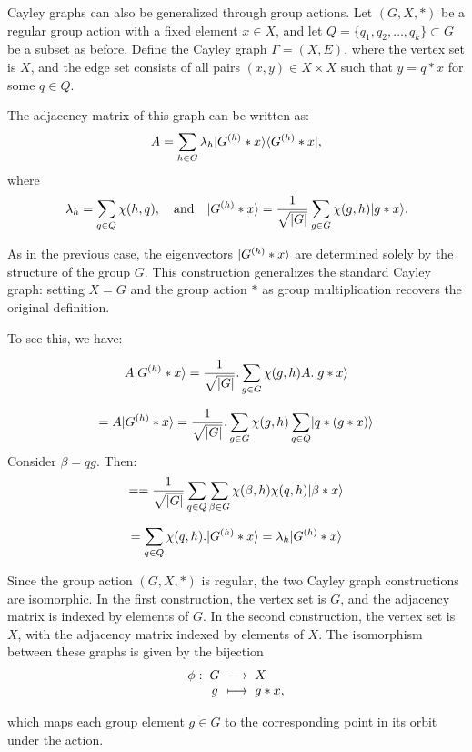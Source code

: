 \documentclass[11pt]{article}
\theoremstyle{definition}
\begin{document}
Cayley graphs can also be generalized through group actions. Let \( (G, X, *) \) be a regular group action with a fixed element \( x \in X \), and let \( Q = \{q_1, q_2, \dots, q_k\} \subset G \) be a subset as before. Define the Cayley graph \( \Gamma = (X, E) \), where the vertex set is \( X \), and the edge set consists of all pairs \( (x, y) \in X \times X \) such that \( y = q * x \) for some \( q \in Q \).

The adjacency matrix of this graph can be written as:
\[
A = \sum_{h \in G} \lambda_h \lvert G^{(h)} * x\rangle \langle G^{(h)} * x\rvert,
\]
where
\[
\lambda_h = \sum_{q \in Q} \chi(h, q), \quad \text{and} \quad \lvert G^{(h)} * x\rangle = \frac{1}{\sqrt{|G|}} \sum_{g \in G} \chi(g, h) \lvert g * x\rangle.
\]

As in the previous case, the eigenvectors \( \lvert G^{(h)} * x\rangle \) are determined solely by the structure of the group \( G \). This construction generalizes the standard Cayley graph: setting \( X = G \) and the group action \( * \) as group multiplication recovers the original definition.


To see this, we have:

\[
    A\lvert G^{(h)}*x\rangle = \frac{1}{\sqrt{|G|}}.\sum_{g \in G}\chi(g,h) A.\lvert g*x\rangle
    \]

    \[
    = A\lvert G^{(h)}*x\rangle = \frac{1}{\sqrt{|G|}}.\sum_{g \in G}\chi(g,h)\sum_{q \in Q}\lvert q*(g*x)\rangle
    \]
    Consider $\beta = qg$. Then:
    \[
    = = \frac{1}{\sqrt{|G|}}\sum_{q \in Q}\sum_{\beta \in G}\chi(\beta,h)\chi(q,h)\lvert\beta * x\rangle
    \]

    \[
    = \sum_{q \in Q}\chi(q,h).\lvert G^{(h)}*x\rangle = \lambda_h \lvert G^{(h)}*x\rangle
    \]

    Since the group action \( (G, X, *) \) is regular, the two Cayley graph constructions are isomorphic. In the first construction, the vertex set is \( G \), and the adjacency matrix is indexed by elements of \( G \). In the second construction, the vertex set is \( X \), with the adjacency matrix indexed by elements of \( X \). The isomorphism between these graphs is given by the bijection
\[
\setlength{\arraycolsep}{1mm}
\begin{array}{rcll}
\phi: & G & \longrightarrow & X \\
      & g & \longmapsto     & g * x,
\end{array}
\]

which maps each group element \( g \in G \) to the corresponding point in its orbit under the action.
\end{document}
